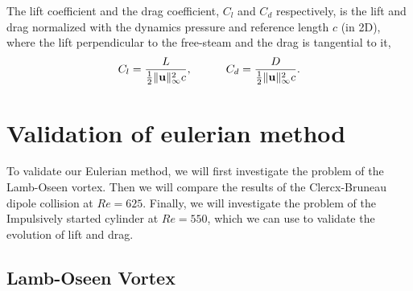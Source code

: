 The lift coefficient and the drag coefficient, $C_l$ and $C_d$ respectively, is the lift and drag normalized with the dynamics pressure and reference length $c$ (in 2D), where the lift perpendicular to the free-steam and the drag is tangential to it,
		\begin{equation}
		C_l = \frac{L}{\frac{1}{2}\lVert\mathbf{u}\rVert_{\infty}^2 c},\qquad \quad
		C_d = \frac{D}{\frac{1}{2}\lVert\mathbf{u}\rVert_{\infty}^2 c}.\\
		\label{eq:LiftDragCoeffEq}
		\end{equation}

\section{Validation of eulerian method}
To validate our Eulerian method, we will first investigate the problem of the Lamb-Oseen vortex. Then we will compare the results of the Clercx-Bruneau dipole collision at $Re=625$. Finally, we will investigate the problem of the Impulsively started cylinder at $Re=550$, which we can use to validate the evolution of lift and drag.

\subsection{Lamb-Oseen Vortex}
\label{subsec:eulerianLambOseen}

